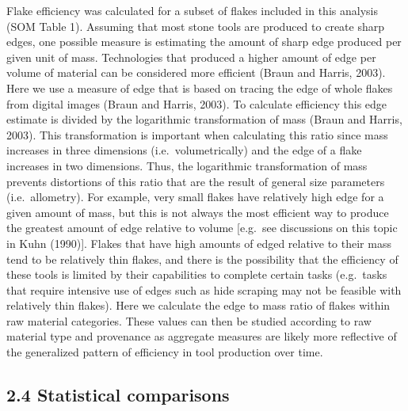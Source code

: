 \documentclass[]{elsarticle} %
\begin{document}
Flake efficiency was calculated for a subset of flakes included in this
analysis (SOM Table 1). Assuming that most stone tools are produced to
create sharp edges, one possible measure is estimating the amount of
sharp edge produced per given unit of mass. Technologies that produced a
higher amount of edge per volume of material can be considered more
efficient (Braun and Harris, 2003). Here we use a measure of edge that
is based on tracing the edge of whole flakes from digital images (Braun
and Harris, 2003). To calculate efficiency this edge estimate is divided
by the logarithmic transformation of mass (Braun and Harris, 2003). This
transformation is important when calculating this ratio since mass
increases in three dimensions (i.e.~volumetrically) and the edge of a
flake increases in two dimensions. Thus, the logarithmic transformation
of mass prevents distortions of this ratio that are the result of
general size parameters (i.e.~allometry). For example, very small flakes
have relatively high edge for a given amount of mass, but this is not
always the most efficient way to produce the greatest amount of edge
relative to volume {[}e.g.~see discussions on this topic in Kuhn
(1990){]}. Flakes that have high amounts of edged relative to their mass
tend to be relatively thin flakes, and there is the possibility that the
efficiency of these tools is limited by their capabilities to complete
certain tasks (e.g.~tasks that require intensive use of edges such as
hide scraping may not be feasible with relatively thin flakes). Here we
calculate the edge to mass ratio of flakes within raw material
categories. These values can then be studied according to raw material
type and provenance as aggregate measures are likely more reflective of
the generalized pattern of efficiency in tool production over time.

\hypertarget{statistical-comparisons}{%
\subsection{2.4 Statistical comparisons}\label{statistical-comparisons}}
\end{document}
